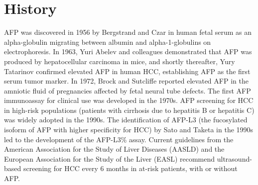\section*{History}
AFP was discovered in 1956 by Bergstrand and Czar in human fetal serum as an alpha-globulin migrating between albumin and alpha-1-globulins on electrophoresis. In 1963, Yuri Abelev and colleagues demonstrated that AFP was produced by hepatocellular carcinoma in mice, and shortly thereafter, Yury Tatarinov confirmed elevated AFP in human HCC, establishing AFP as the first serum tumor marker. In 1972, Brock and Sutcliffe reported elevated AFP in the amniotic fluid of pregnancies affected by fetal neural tube defects. The first AFP immunoassay for clinical use was developed in the 1970s. AFP screening for HCC in high-risk populations (patients with cirrhosis due to hepatitis B or hepatitis C) was widely adopted in the 1990s. The identification of AFP-L3 (the fucosylated isoform of AFP with higher specificity for HCC) by Sato and Taketa in the 1990s led to the development of the AFP-L3\% assay. Current guidelines from the American Association for the Study of Liver Diseases (AASLD) and the European Association for the Study of the Liver (EASL) recommend ultrasound-based screening for HCC every 6 months in at-risk patients, with or without AFP.

